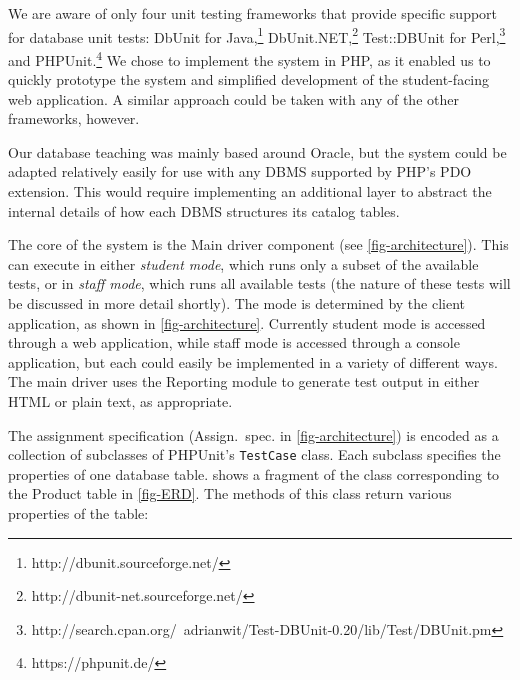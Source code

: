 \documentclass[sigconf, review, anonymous, capitalise]{acmart}
\begin{document}
We are aware of only four unit testing frameworks that provide specific support for database unit tests: DbUnit for Java,\footnote{http://dbunit.sourceforge.net/} DbUnit.NET,\footnote{http://dbunit-net.sourceforge.net/} Test::DBUnit for Perl,\footnote{http://search.cpan.org/~adrianwit/Test-DBUnit-0.20/lib/Test/DBUnit.pm} and PHPUnit.\footnote{https://phpunit.de/} We chose to implement the system in PHP, as it enabled us to quickly prototype the system and simplified development of the student-facing web application. A similar approach could be taken with any of the other frameworks, however.

Our database teaching was mainly based around Oracle, but the system could be adapted relatively easily for use with any DBMS supported by PHP's PDO extension. This would require implementing an additional layer to abstract the internal details of how each DBMS structures its catalog tables.

The core of the system is the \textsf{Main driver} component (see \cref{fig-architecture}). This can execute in either \emph{student mode}, which runs only a subset of the available tests, or in \emph{staff mode}, which runs all available tests (the nature of these tests will be discussed in more detail shortly). The mode is determined by the client application, as shown in \cref{fig-architecture}. Currently student mode is accessed through a web application, while staff mode is accessed through a console application, but each could easily be implemented in a variety of different ways. The main driver uses the \textsf{Reporting} module to generate test output in either HTML or plain text, as appropriate.

The assignment specification (\textsf{Assign.\ spec.} in \cref{fig-architecture}) is encoded as a collection of subclasses of PHPUnit's \texttt{TestCase} class. Each subclass specifies the properties of one database table.  shows a fragment of the class corresponding to the \textsf{Product} table in \cref{fig-ERD}. The methods of this class return various properties of the table:
\end{document}
